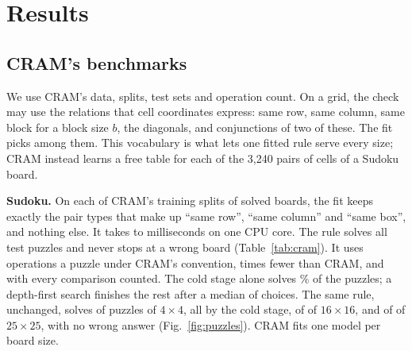 \section{Results}\label{sec:results}

\subsection{CRAM's benchmarks}\label{sec:cram}

We use CRAM's data, splits, test sets and operation count\cite{hoover2026classical}. On a grid, the check may use the
relations that cell coordinates express: same row, same column, same block for a block size $b$, the diagonals, and
conjunctions of two of these. The fit picks among them. This vocabulary is what lets one fitted rule serve every size;
CRAM instead learns a free table for each of the 3,240 pairs of cells of a Sudoku board.

\textbf{Sudoku.} On each of CRAM's  training splits of  solved boards, the fit
keeps exactly the  pair types that make up ``same row'', ``same column'' and ``same box'', and nothing
else. It takes  to  milliseconds on one CPU core. The rule solves all
 test puzzles and never stops at a wrong board (Table~\ref{tab:cram}). It uses 
operations a puzzle under CRAM's convention,  times fewer than CRAM, and  with
every comparison counted. The cold stage alone solves \% of the puzzles; a depth-first search
finishes the rest after a median of  choices. The same rule, unchanged, solves
 of  puzzles of $4\times4$, all by the cold stage,  of  of
$16\times16$, and  of  of $25\times25$, with no wrong answer (Fig.~\ref{fig:puzzles}).
CRAM fits one model per board size.

